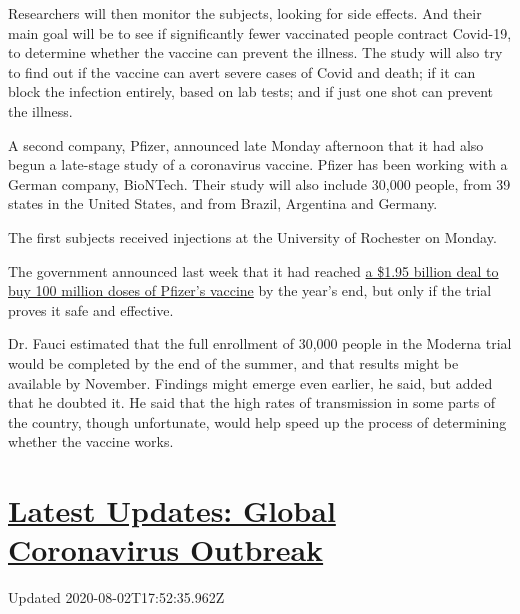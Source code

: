 Researchers will then monitor the subjects, looking for side effects.
And their main goal will be to see if significantly fewer vaccinated
people contract Covid-19, to determine whether the vaccine can prevent
the illness. The study will also try to find out if the vaccine can
avert severe cases of Covid and death; if it can block the infection
entirely, based on lab tests; and if just one shot can prevent the
illness.

A second company, Pfizer, announced late Monday afternoon that it had
also begun a late-stage study of a coronavirus vaccine. Pfizer has been
working with a German company, BioNTech. Their study will also include
30,000 people, from 39 states in the United States, and from Brazil,
Argentina and Germany.

The first subjects received injections at the University of Rochester on
Monday.

The government announced last week that it had reached
\href{https://www.nytimes3xbfgragh.onion/2020/07/22/us/politics/pfizer-coronavirus-vaccine.html}{a
\$1.95 billion deal to buy 100 million doses of Pfizer's vaccine} by the
year's end, but only if the trial proves it safe and effective.

Dr. Fauci estimated that the full enrollment of 30,000 people in the
Moderna trial would be completed by the end of the summer, and that
results might be available by November. Findings might emerge even
earlier, he said, but added that he doubted it. He said that the high
rates of transmission in some parts of the country, though unfortunate,
would help speed up the process of determining whether the vaccine
works.

\hypertarget{latest-updates-global-coronavirus-outbreak}{%
\section{\texorpdfstring{\href{https://www.nytimes3xbfgragh.onion/2020/08/01/world/coronavirus-covid-19.html?action=click\&pgtype=Article\&state=default\&region=MAIN_CONTENT_1\&context=storylines_live_updates}{Latest
Updates: Global Coronavirus
Outbreak}}{Latest Updates: Global Coronavirus Outbreak}}\label{latest-updates-global-coronavirus-outbreak}}

Updated 2020-08-02T17:52:35.962Z

